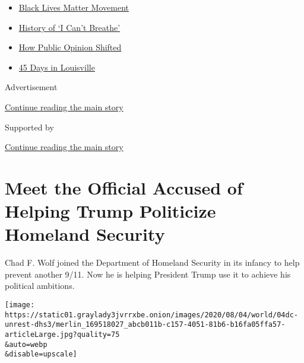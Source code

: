 \begin{itemize}
\tightlist
\item
  \href{https://www.nytimes3xbfgragh.onion/interactive/2020/07/03/us/george-floyd-protests-crowd-size.html?name=styln-george-floyd\&region=TOP_BANNER\&variant=undefined\&block=storyline_menu_recirc\&action=click\&pgtype=Article\&impression_id=2ce5ae21-e39a-11ea-8c8a-b7fbae24c18c}{Black
  Lives Matter Movement}
\item
  \href{https://www.nytimes3xbfgragh.onion/interactive/2020/06/28/us/i-cant-breathe-police-arrest.html?name=styln-george-floyd\&region=TOP_BANNER\&variant=undefined\&block=storyline_menu_recirc\&action=click\&pgtype=Article\&impression_id=2ce5ae22-e39a-11ea-8c8a-b7fbae24c18c}{History
  of `I Can't Breathe'}
\item
  \href{https://www.nytimes3xbfgragh.onion/interactive/2020/06/10/upshot/black-lives-matter-attitudes.html?name=styln-george-floyd\&region=TOP_BANNER\&variant=undefined\&block=storyline_menu_recirc\&action=click\&pgtype=Article\&impression_id=2ce5d530-e39a-11ea-8c8a-b7fbae24c18c}{How
  Public Opinion Shifted}
\item
  \href{https://www.nytimes3xbfgragh.onion/interactive/2020/07/16/us/black-lives-matter-protests-louisville-breonna-taylor.html?name=styln-george-floyd\&region=TOP_BANNER\&variant=undefined\&block=storyline_menu_recirc\&action=click\&pgtype=Article\&impression_id=2ce5d531-e39a-11ea-8c8a-b7fbae24c18c}{45
  Days in Louisville}
\end{itemize}

Advertisement

\protect\hyperlink{after-top}{Continue reading the main story}

Supported by

\protect\hyperlink{after-sponsor}{Continue reading the main story}

\hypertarget{meet-the-official-accused-of-helping-trump-politicize-homeland-security}{%
\section{Meet the Official Accused of Helping Trump Politicize Homeland
Security}\label{meet-the-official-accused-of-helping-trump-politicize-homeland-security}}

Chad F. Wolf joined the Department of Homeland Security in its infancy
to help prevent another 9/11. Now he is helping President Trump use it
to achieve his political ambitions.

\texttt{[image: https://static01.graylady3jvrrxbe.onion/images/2020/08/04/world/04dc-unrest-dhs3/merlin\_169518027\_abcb011b-c157-4051-81b6-b16fa05ffa57-articleLarge.jpg?quality=75\\\&auto=webp\\\&disable=upscale]}

